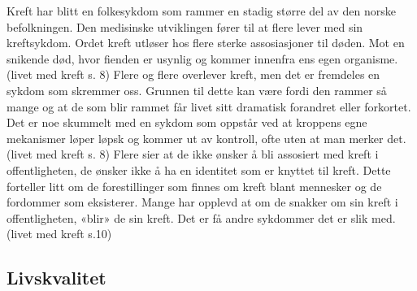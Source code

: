 Kreft har blitt en folkesykdom som rammer en stadig større del av den norske
befolkningen. Den medisinske utviklingen fører til at flere lever med sin
kreftsykdom. Ordet kreft utløser hos flere sterke assosiasjoner til døden. Mot
en snikende død, hvor fienden er usynlig og kommer innenfra ens egen organisme.
(livet med kreft s. 8) Flere og flere overlever kreft, men det er fremdeles en
sykdom som skremmer oss. Grunnen til dette kan være fordi den rammer så mange
og at de som blir rammet får livet sitt dramatisk forandret eller forkortet.
Det er noe skummelt med en sykdom som oppstår ved at kroppens egne mekanismer
løper løpsk og kommer ut av kontroll, ofte uten at man merker det. (livet med
kreft s. 8) Flere sier at de ikke ønsker å bli assosiert med kreft i
offentligheten, de ønsker ikke å ha en identitet som er knyttet til kreft.
Dette forteller litt om de forestillinger som finnes om kreft blant mennesker
og de fordommer som eksisterer. Mange har opplevd at om de snakker om sin kreft
i offentligheten, «blir» de sin kreft. Det er få andre sykdommer det er slik
med. (livet med kreft s.10)

\subsection{Livskvalitet}

